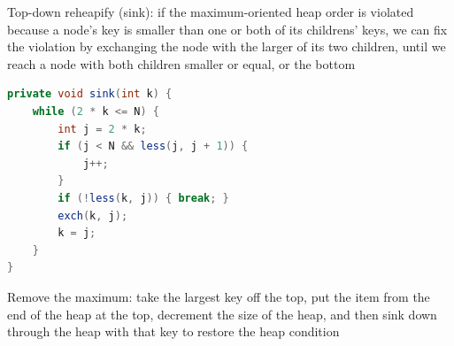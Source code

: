 \documentclass[8pt,a4paper,compress]{beamer}
\begin{document}
\begin{frame}[fragile]
\pause

Top-down reheapify (sink): if the maximum-oriented heap order is violated because a node's key is smaller than one or both of its childrens' keys, we can fix the violation by exchanging the node with the larger of its two children, until we reach a node with both children smaller or equal, or the bottom 

\pause
\bigskip

\begin{minipage}{150pt}
\begin{lstlisting}[language=Java]
private void sink(int k) {
    while (2 * k <= N) {
        int j = 2 * k;
        if (j < N && less(j, j + 1)) { 
            j++; 
        }
        if (!less(k, j)) { break; }
        exch(k, j);
        k = j;
    }
}
\end{lstlisting}
\end{minipage}%
\begin{minipage}{130pt}
\hfill {}
\end{minipage}

\pause
\bigskip

Remove the maximum: take the largest key off the top, put the item from the end of the heap at the top, decrement the size of the heap, and then sink down through the heap with that key to restore the heap condition
\end{frame}
\end{document}
